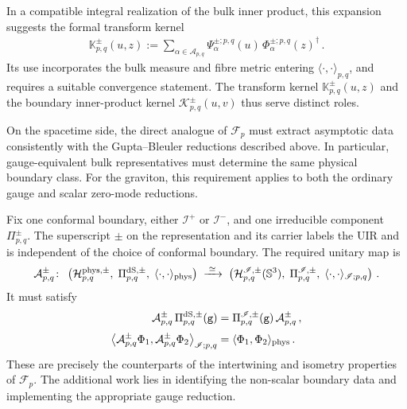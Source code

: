 \documentclass{SciPost}
\begin{document}
In a compatible integral realization of the bulk inner product, this expansion suggests the formal transform kernel
\begin{align}
    \mathbb K_{p,q}^{\pm}(u,z)
    :=
    \sum_{\alpha\in{\mathcal A}_{p,q}}
    \Psi_{\alpha}^{\pm;p,q}(u)\,
    \Phi_{\alpha}^{\pm;p,q}(z)^\dagger \,.
\end{align}
Its use incorporates the bulk measure and fibre metric entering $\langle\cdot,\cdot\rangle_{p,q}$, and requires a suitable convergence statement. The transform kernel $\mathbb K_{p,q}^{\pm}(u,z)$ and the boundary inner-product kernel ${\mathcal K}_{p,q}^{\pm}(u,v)$ thus serve distinct roles.

On the spacetime side, the direct analogue of $\mathcal F_p$ must extract asymptotic data consistently with the Gupta--Bleuler reductions described above. In particular, gauge-equivalent bulk representatives must determine the same physical boundary class. For the graviton, this requirement applies to both the ordinary gauge and scalar zero-mode reductions.

Fix one conformal boundary, either $\mathscr I^+$ or $\mathscr I^-$, and one irreducible component $\Pi^\pm_{p,q}$. The superscript $\pm$ on the representation and its carrier labels the UIR and is independent of the choice of conformal boundary. The required unitary map is
\begin{align}
    {\mathcal A}_{p,q}^{\pm}\colon\;
    \left(
        {\cal H}_{p,q}^{{\rm phys},\pm},\;
        \Pi_{p,q}^{\mathrm{dS},\pm},\;
        \langle\cdot,\cdot\rangle_{\rm phys}
    \right)
    \;\xrightarrow{\;\simeq\;}\;
    \left(
        {\mathcal H}_{p,q}^{\mathscr I,\pm}(\mathbb S^3),\;
        \Pi_{p,q}^{\mathscr I,\pm},\;
        \langle\cdot,\cdot\rangle_{\mathscr I;p,q}
    \right) \,.
\end{align}
It must satisfy
\begin{align}
    {\mathcal A}_{p,q}^{\pm}\,
    \Pi_{p,q}^{\mathrm{dS},\pm}(\texttt{g})
    &=
    \Pi_{p,q}^{\mathscr I,\pm}(\texttt{g})\,
    {\mathcal A}_{p,q}^{\pm} \,,
    \\[3pt]
    \left\langle
        {\mathcal A}_{p,q}^{\pm}\Phi_1,
        {\mathcal A}_{p,q}^{\pm}\Phi_2
    \right\rangle_{\mathscr I;p,q}
    &=
    \langle\Phi_1,\Phi_2\rangle_{\rm phys} \,.
\end{align}
These are precisely the counterparts of the intertwining and isometry properties of $\mathcal F_p$. The additional work lies in identifying the non-scalar boundary data and implementing the appropriate gauge reduction.
\end{document}
